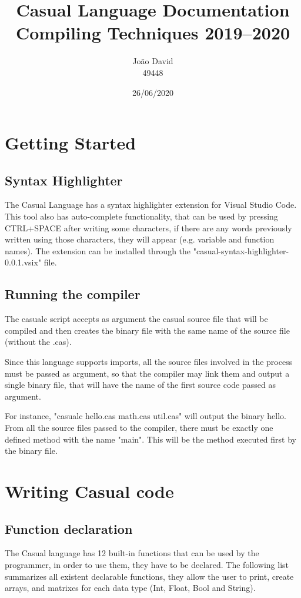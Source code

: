\documentclass[12pt]{article}
\title{Casual Language Documentation \\
  \Large Compiling Techniques 2019--2020
}
\author{
  João David\\49448
}
\date{26/06/2020}
\begin{document}
\maketitle


\section{Getting Started}
\subsection{Syntax Highlighter}
The Casual Language has a syntax highlighter extension for Visual Studio Code. This tool also has auto-complete functionality, that can be used by pressing CTRL+SPACE after writing some characters, if there are any words previously written using those characters, they will appear (e.g. variable and function names).
The extension can be installed through the "casual-syntax-highlighter-0.0.1.vsix" file.

\subsection{Running the compiler}
The casualc script accepts as argument the casual source file that will be compiled and then creates the binary file with the same name of the source file (without the .cas). 

Since this language supports imports, all the source files involved in the process must be passed as argument, so that the compiler may link them and output a single binary file, that will have the name of the first source code passed as argument.

For instance, "casualc hello.cas math.cas util.cas" will output the binary hello.
From all the source files passed to the compiler, there must be exactly one defined method with the name "main". This will be the method executed first by the binary file.

\newpage

\section{Writing Casual code}
\subsection{Function declaration}
The Casual language has 12 built-in functions that can be used by the programmer, in order to use them, they have to be declared. The following list summarizes all existent declarable functions, they allow the user to print, create arrays, and matrixes for each data type (Int, Float, Bool and String). \\
\end{document}
